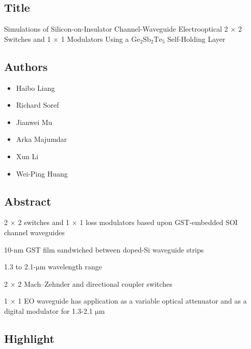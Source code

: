 \documentclass[]{article}
\date{}
\providecommand{\tightlist}{%
  \setlength{\itemsep}{0pt}\setlength{\parskip}{0pt}}
\begin{document}
\subsection{Title}\label{title}

Simulations of Silicon-on-Insulator Channel-Waveguide Electrooptical 2 ×
2 Switches and 1 × 1 Modulators Using a \(\mathrm{Ge_2 Sb_2 Te_5}\)
Self-Holding Layer

\subsection{Authors}\label{authors}

\begin{itemize}
\tightlist
\item
  Haibo Liang
\item
  Richard Soref
\item
  Jianwei Mu
\item
  Arka Majumdar
\item
  Xun Li
\item
  Wei-Ping Huang
\end{itemize}

\subsection{Abstract}\label{abstract}

2 × 2 switches and 1 × 1 loss modulators based upon GST-embedded SOI
channel waveguides

10-nm GST film sandwiched between doped-Si waveguide strips

1.3 to 2.1-\(\mathrm{\mu m}\) wavelength range

2 × 2 Mach--Zehnder and directional coupler switches

1 × 1 EO waveguide has application as a variable optical attenuator and
as a digital modulator for 1.3-2.1 \(\mathrm{\mu m}\)

\subsection{Highlight}\label{highlight}
\end{document}
